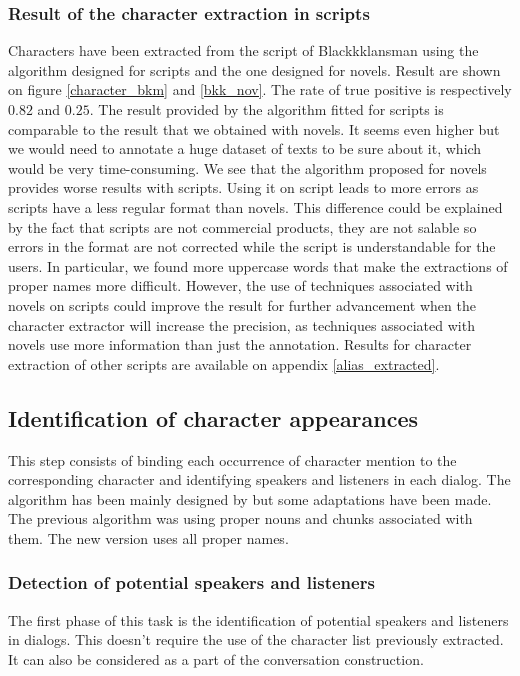 \documentclass[a4paper, 12pt]{report}
\begin{document}
\subsubsection{Result of the character extraction in scripts}
Characters have been extracted from the script of Blackkklansman using the algorithm designed for scripts and the one designed for novels.
Result are shown on figure \ref{character_bkm} and \ref{bkk_nov}. The rate of true positive is respectively $0.82$ and $0.25$.
The result provided by the algorithm fitted for scripts is comparable to the result that we obtained with novels.
It seems even higher but we would need to annotate a huge dataset of texts to be sure about it, which would be very time-consuming.
We see that the algorithm proposed for novels provides worse results with scripts. Using it on script leads to more errors as scripts have a less regular format than novels.
This difference could be explained by the fact that scripts are not commercial products, they are not salable so errors in the format are not corrected while the script is understandable for the users.
In particular, we found more uppercase words that make the extractions of proper names more difficult.
However, the use of techniques associated with novels on scripts could improve the result for further advancement when the character extractor will increase the precision,
as techniques associated with novels use more information than just the annotation. Results for character extraction of other scripts are available on appendix \ref{alias_extracted}.\\


\subsection{Identification of character appearances}
\label{identification}
This step consists of binding each occurrence of character mention to the corresponding character and identifying speakers and listeners in each dialog.
The algorithm has been mainly designed by \cite{original_thesis} but some adaptations have been made.
The previous algorithm was using proper nouns and chunks associated with them.
The new version uses all proper names.\\

\subsubsection{Detection of potential speakers and listeners}
The first phase of this task is the identification of potential speakers and listeners in dialogs. This doesn't require the use of the character list previously extracted. It can also be considered as a part of the conversation construction.\\
\end{document}
